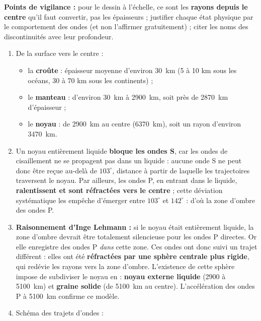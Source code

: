 \documentclass[11pt]{article}
\begin{document}
\begin{corrige}
\textbf{Points de vigilance :} pour le dessin à l'échelle, ce sont les \textbf{rayons depuis le centre} qu'il faut convertir, pas les épaisseurs ; justifier chaque état physique par le comportement des ondes (et non l'affirmer gratuitement) ; citer les noms des discontinuités avec leur profondeur.
\end{corrige}

\begin{corrige}
\begin{enumerate}
\item De la surface vers le centre :
\begin{itemize}
\item la \textbf{croûte} : épaisseur moyenne d'environ \SI{30}{km} (5 à 10 km sous les océans, 30 à 70 km sous les continents) ;
\item le \textbf{manteau} : d'environ \SI{30}{km} à \SI{2900}{km}, soit près de \SI{2870}{km} d'épaisseur ;
\item le \textbf{noyau} : de \SI{2900}{km} au centre (\SI{6370}{km}), soit un rayon d'environ \SI{3470}{km}.
\end{itemize}
\item Un noyau entièrement liquide \textbf{bloque les ondes S}, car les ondes de cisaillement ne se propagent pas dans un liquide : aucune onde S ne peut donc être reçue au-delà de $103^{\circ}$, distance à partir de laquelle les trajectoires traversent le noyau. Par ailleurs, les ondes P, en entrant dans le liquide, \textbf{ralentissent et sont réfractées vers le centre} ; cette déviation systématique les empêche d'émerger entre $103^{\circ}$ et $142^{\circ}$ : d'où la zone d'ombre des ondes P.
\item \textbf{Raisonnement d'Inge Lehmann :} si le noyau était entièrement liquide, la zone d'ombre devrait être totalement silencieuse pour les ondes P directes. Or elle enregistre des ondes P \emph{dans} cette zone. Ces ondes ont donc suivi un trajet différent : elles ont été \textbf{réfractées par une sphère centrale plus rigide}, qui redévie les rayons vers la zone d'ombre. L'existence de cette sphère impose de subdiviser le noyau en : \textbf{noyau externe liquide} (2900 à \SI{5100}{km}) et \textbf{graine solide} (de \SI{5100}{km} au centre). L'accélération des ondes P à \SI{5100}{km} confirme ce modèle.
\item Schéma des trajets d'ondes :
\end{enumerate}
\begin{popfigure}

\end{popfigure}
\end{corrige}
\end{document}
